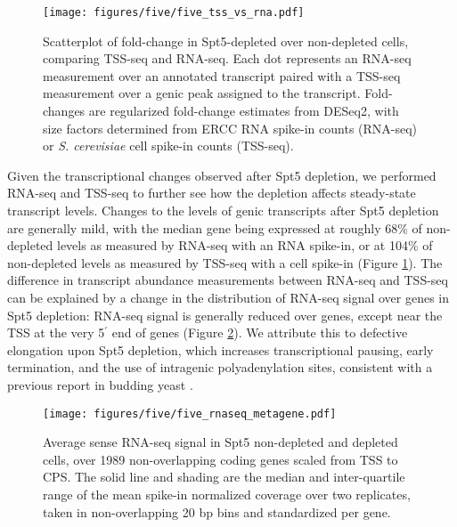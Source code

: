 \begin{figure}[h]
    \centering
    \texttt{[image: figures/five/five\_tss\_vs\_rna.pdf]}
    \caption[Scatterplot of fold-change in Spt5-depleted over non-depleted cells, comparing TSS-seq and RNA-seq.]{Scatterplot of fold-change in Spt5-depleted over non-depleted cells, comparing TSS-seq and RNA-seq. Each dot represents an RNA-seq measurement over an annotated transcript paired with a TSS-seq measurement over a genic peak assigned to the transcript. Fold-changes are regularized fold-change estimates from DESeq2, with size factors determined from ERCC RNA spike-in counts (RNA-seq) or \textit{S. cerevisiae} cell spike-in counts (TSS-seq).}
    \label{fig:five_tss_vs_rna}
\end{figure}
Given the transcriptional changes observed after Spt5 depletion, we performed RNA-seq and TSS-seq to further see how the depletion affects steady-state transcript levels.
Changes to the levels of genic transcripts after Spt5 depletion are generally mild, with the median gene being expressed at roughly 68\% of non-depleted levels as measured by RNA-seq with an RNA spike-in, or at 104\% of non-depleted levels as measured by TSS-seq with a cell spike-in (Figure \ref{fig:five_tss_vs_rna}).
The difference in transcript abundance measurements between RNA-seq and TSS-seq can be explained by a change in the distribution of RNA-seq signal over genes in Spt5 depletion: RNA-seq signal is generally reduced over genes, except near the TSS at the very 5$^\prime$ end of genes (Figure \ref{fig:five_rnaseq_metagene}).
We attribute this to defective elongation upon Spt5 depletion, which increases transcriptional pausing, early termination, and the use of intragenic polyadenylation sites, consistent with a previous report in budding yeast \citep{cui2003}.
\begin{figure}[h]
    \centering
    \texttt{[image: figures/five/five\_rnaseq\_metagene.pdf]}
    \caption[Average sense RNA-seq signal over non-overlapping coding genes, from Spt5-depleted and non-depleted cells.]{Average sense RNA-seq signal in Spt5 non-depleted and depleted cells, over 1989 non-overlapping coding genes scaled from TSS to CPS. The solid line and shading are the median and inter-quartile range of the mean spike-in normalized coverage over two replicates, taken in non-overlapping 20 bp bins and standardized per gene.}
    \label{fig:five_rnaseq_metagene}
\end{figure}


